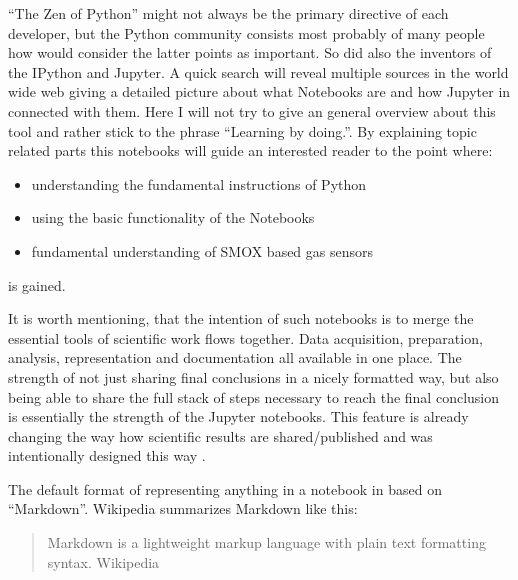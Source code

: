 \documentclass[11pt]{article}
\providecommand{\tightlist}{%
      \setlength{\itemsep}{0pt}\setlength{\parskip}{0pt}}
\begin{document}
``The Zen of Python'' might not always be the primary directive of each
developer, but the Python community consists most probably of many
people how would consider the latter points as important. So did also
the inventors of the IPython and Jupyter. A quick search will reveal
multiple sources in the world wide web giving a detailed picture about
what Notebooks are and how Jupyter in connected with them. Here I will
not try to give an general overview about this tool and rather stick to
the phrase ``Learning by doing.''. By explaining topic related parts
this notebooks will guide an interested reader to the point where:

\begin{itemize}
\tightlist
\item
  understanding the fundamental instructions of Python
\item
  using the basic functionality of the Notebooks
\item
  fundamental understanding of SMOX based gas sensors
\end{itemize}

is gained.

It is worth mentioning, that the intention of such notebooks is to merge
the essential tools of scientific work flows together. Data acquisition,
preparation, analysis, representation and documentation all available in
one place. The strength of not just sharing final conclusions in a
nicely formatted way, but also being able to share the full stack of
steps necessary to reach the final conclusion is essentially the
strength of the Jupyter notebooks. This feature is already changing the
way how scientific results are shared/published and was intentionally
designed this way \cite{Randles2017}.

The default format of representing anything in a notebook in based on
``Markdown''. Wikipedia summarizes Markdown like this:

\begin{quote}
Markdown is a lightweight markup language with plain text formatting
syntax. Wikipedia
\end{quote}
\end{document}
